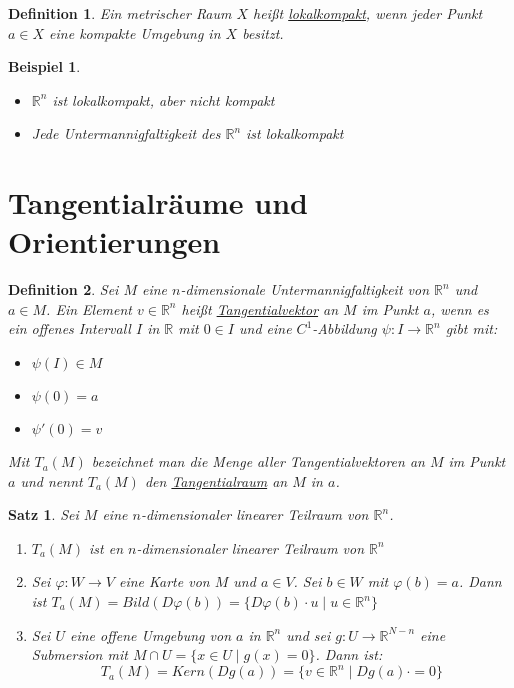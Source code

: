 \documentclass[10pt,a4paper]{report}
\newtheorem{satz}{Satz}
\newtheorem*{defi}{Definition}
\newtheorem*{example}{Beispiel}
\begin{document}
\begin{defi}
  Ein metrischer Raum $X$ heißt \underline{lokalkompakt}, wenn jeder Punkt $a \in X$ eine kompakte Umgebung in $X$ besitzt.
\end{defi}

\begin{example}
  \begin{itemize}
  \item $\mathbb{R}^{n}$ ist lokalkompakt, aber nicht kompakt
  \item Jede Untermannigfaltigkeit des $\mathbb{R}^{n}$ ist lokalkompakt
  \end{itemize}
\end{example}

\section{Tangentialräume und Orientierungen}

\begin{defi}
  Sei $M$ eine $n$-dimensionale Untermannigfaltigkeit von $\mathbb{R}^{n}$ und $a \in M$.
  Ein Element $v \in \mathbb{R}^{n}$ heißt \underline{Tangentialvektor} an $M$ im Punkt $a$, wenn es ein offenes Intervall $I$ in $\mathbb{R}$ mit $0 \in I$ und eine $C^{1}$-Abbildung $\psi : I \rightarrow \mathbb{R}^{n}$ gibt mit:
  \begin{itemize}
    \item $\psi(I) \in M$
    \item $\psi(0) = a$
    \item $\psi'(0) = v$
  \end{itemize}
  Mit $T_{a}(M)$ bezeichnet man die Menge aller Tangentialvektoren an $M$ im Punkt $a$ und nennt $T_{a}(M)$ den \underline{Tangentialraum} an $M$ in $a$.
\end{defi}

\begin{satz}
  Sei $M$ eine $n$-dimensionaler linearer Teilraum von $\mathbb{R}^{n}$.
  \begin{enumerate}[label={\alph*)}]
    \item $T_{a}(M)$ ist en $n$-dimensionaler linearer Teilraum von $\mathbb{R}^{n}$
    \item Sei $\varphi : W \rightarrow V$ eine Karte von $M$ und $a \in V$. Sei $b \in W$ mit $\varphi(b) = a$. Dann ist $T_{a}(M) = Bild(D\varphi(b)) = \{ D\varphi(b) \cdot u \mid u \in \mathbb{R}^{n} \}$
    \item Sei $U$ eine offene Umgebung von $a$ in $\mathbb{R}^{n}$ und sei $g : U \rightarrow \mathbb{R}^{N - n}$ eine Submersion mit $M \cap U = \{ x \in U \mid g(x) = 0 \}$.
      Dann ist:
      \begin{equation}
        T_{a}(M) = Kern(Dg(a)) = \{ v \in \mathbb{R}^{n} \mid Dg(a) \cdot = 0 \}
      \end{equation}
  \end{enumerate}
\end{satz}
\end{document}
